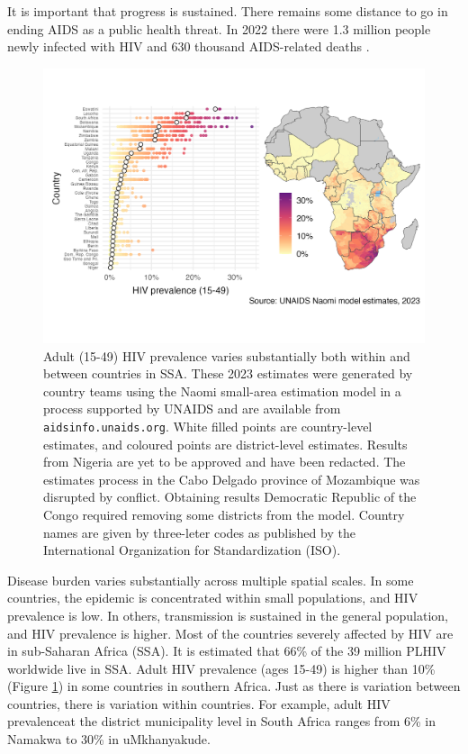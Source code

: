 \documentclass[a4paper, nobind]{templates/ociamthesis}
\begin{document}
It is important that progress is sustained.
There remains some distance to go in ending AIDS as a public health threat.
In 2022 there were 1.3 million people newly infected with HIV and 630 thousand AIDS-related deaths \autocite{unaids2022global}.

\begin{figure}

{\centering \includegraphics[width=0.95\linewidth]{figures/hiv-aids/naomi-continent} 

}

\caption{Adult (15-49) HIV prevalence varies substantially both within and between countries in SSA. These 2023 estimates were generated by country teams using the Naomi small-area estimation model in a process supported by UNAIDS and are available from \texttt{aidsinfo.unaids.org}. White filled points are country-level estimates, and coloured points are district-level estimates. Results from Nigeria are yet to be approved and have been redacted. The estimates process in the Cabo Delgado province of Mozambique was disrupted by conflict. Obtaining results Democratic Republic of the Congo required removing some districts from the model. Country names are given by three-leter codes as published by the International Organization for Standardization (ISO).}\label{fig:naomi-continent}
\end{figure}

Disease burden varies substantially across multiple spatial scales.
In some countries, the epidemic is concentrated within small populations, and HIV prevalence is low.
In others, transmission is sustained in the general population, and HIV prevalence is higher.
Most of the countries severely affected by HIV are in sub-Saharan Africa (SSA).
It is estimated that 66\% of the 39 million PLHIV worldwide live in SSA.
Adult HIV prevalence (ages 15-49) is higher than 10\% (Figure \ref{fig:naomi-continent}) in some countries in southern Africa.
Just as there is variation between countries, there is variation within countries.
For example, adult HIV prevalenceat the district municipality level in South Africa ranges from 6\% in Namakwa to 30\% in uMkhanyakude.
\end{document}
